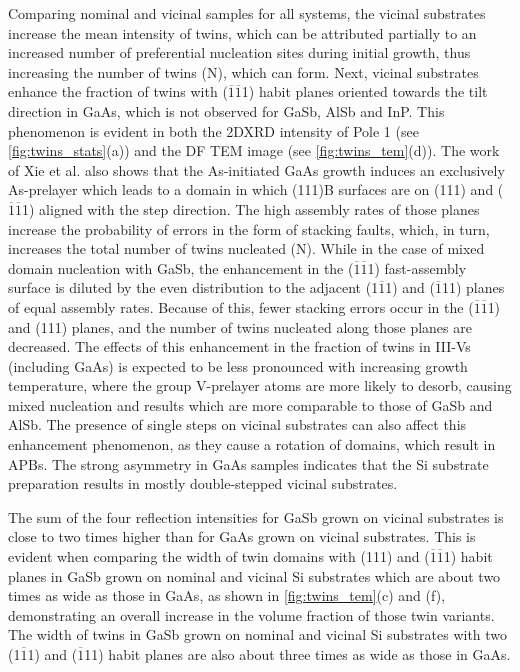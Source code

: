 Comparing nominal and vicinal samples for all systems, the vicinal substrates increase the mean intensity of twins, which can be attributed partially to an increased number of preferential nucleation sites during initial growth, thus increasing the number of twins (N), which can form.
Next, vicinal substrates enhance the fraction of twins with
(\(\overline{1}\overline{1}\)1)
habit planes oriented towards the tilt direction in GaAs, which is not observed for GaSb, AlSb and InP\@. This phenomenon is evident in both the 2DXRD intensity of Pole 1 (see \cref{fig:twins_stats}(a)) and the DF TEM image (see \cref{fig:twins_tem}(d)).
The work of Xie et al.
also shows that the As-initiated GaAs growth induces an exclusively As-prelayer which leads to a domain in which (111)B surfaces are on (111) and
(\(\overline{1}\overline{1}\)1)
aligned with the step direction.
The high assembly rates of those planes increase the probability of errors in the form of stacking faults, which, in turn, increases the total number of twins nucleated (N).
While in the case of mixed domain nucleation with GaSb, the enhancement in the
(\(\overline{1}\overline{1}\)1)
fast-assembly surface is diluted by the even distribution to the adjacent (1\(\overline{1}\)1) and (\(\overline{1}\)11) planes of equal assembly rates.
Because of this, fewer stacking errors occur in the
(\(\overline{1}\overline{1}\)1)
and (111) planes, and the number of twins nucleated along those planes are decreased.
The effects of this enhancement in the fraction of twins in III-Vs (including GaAs) is expected to be less pronounced with increasing growth temperature, where the group V-prelayer atoms are more likely to desorb, causing mixed nucleation and results which are more comparable to those of GaSb and AlSb.
The presence of single steps on vicinal substrates can also affect this enhancement phenomenon, as they cause a rotation of domains, which result in APBs.
The strong asymmetry in GaAs samples indicates that the Si substrate preparation results in mostly double-stepped vicinal substrates.

The sum of the four reflection intensities for GaSb grown on vicinal substrates is close to two times higher than for GaAs grown on vicinal substrates.
This is evident when comparing the width of twin domains with (111) and
(\(\overline{1}\overline{1}\)1)
habit planes in GaSb grown on nominal and vicinal Si substrates which are about two times as wide as those in GaAs, as shown in \cref{fig:twins_tem}(c) and (f), demonstrating an overall increase in the volume fraction of those twin variants.
The width of twins in GaSb grown on nominal and vicinal Si substrates with two (1\(\overline{1}\)1) and (\(\overline{1}\)11) habit planes are also about three times as wide as those in GaAs.

